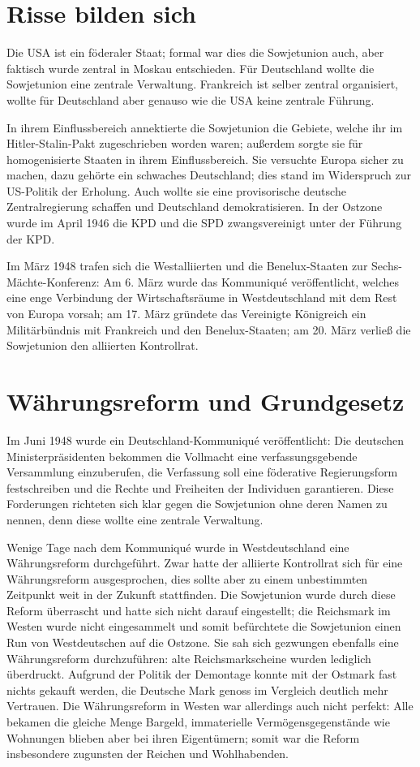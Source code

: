\documentclass[10pt,a4paper,oneside,ngerman,numbers=noenddot]{scrartcl}
\begin{document}
\section{Risse bilden sich}

Die USA ist ein föderaler Staat; formal war dies die Sowjetunion auch, aber faktisch wurde zentral in Moskau
entschieden. Für Deutschland wollte die Sowjetunion eine zentrale Verwaltung. Frankreich ist selber zentral 
organisiert, wollte für Deutschland aber genauso wie die USA keine zentrale Führung.

In ihrem Einflussbereich annektierte die Sowjetunion die Gebiete, welche ihr im Hitler-Stalin-Pakt zugeschrieben
worden waren; außerdem sorgte sie für homogenisierte Staaten in ihrem Einflussbereich. Sie versuchte Europa
sicher zu machen, dazu gehörte ein schwaches Deutschland; dies stand im Widerspruch zur US-Politik der 
Erholung. Auch wollte sie eine provisorische deutsche Zentralregierung schaffen und Deutschland demokratisieren.
In der Ostzone wurde im April 1946 die KPD und die SPD zwangsvereinigt unter der Führung der KPD.

Im März 1948 trafen sich die Westalliierten und die Benelux-Staaten zur Sechs-Mächte-Konferenz: Am 6. März
wurde das Kommuniqué veröffentlicht, welches eine enge Verbindung der Wirtschaftsräume in Westdeutschland mit
dem Rest von Europa vorsah; am 17. März gründete das Vereinigte Königreich ein Militärbündnis mit Frankreich und 
den Benelux-Staaten; am 20. März verließ die Sowjetunion den alliierten Kontrollrat. 

\section{Währungsreform und Grundgesetz}

Im Juni 1948 wurde ein Deutschland-Kommuniqué veröffentlicht: Die deutschen Ministerpräsidenten bekommen die
Vollmacht eine verfassungsgebende Versammlung einzuberufen, die Verfassung soll eine föderative Regierungsform
festschreiben und die Rechte und Freiheiten der Individuen garantieren. Diese Forderungen richteten
sich klar gegen die Sowjetunion ohne deren Namen zu nennen, denn diese wollte eine zentrale Verwaltung.

Wenige Tage nach dem Kommuniqué wurde in Westdeutschland eine Währungsreform durchgeführt. Zwar hatte der
alliierte Kontrollrat sich für eine Währungsreform ausgesprochen, dies sollte aber zu einem unbestimmten Zeitpunkt
weit in der Zukunft stattfinden. Die Sowjetunion wurde durch diese Reform überrascht und hatte sich nicht
darauf eingestellt; die Reichsmark im Westen wurde nicht eingesammelt und somit befürchtete die Sowjetunion einen
Run von Westdeutschen auf die Ostzone. Sie sah sich gezwungen ebenfalls eine Währungsreform durchzuführen:
alte Reichsmarkscheine wurden lediglich überdruckt. Aufgrund der Politik der Demontage konnte mit der Ostmark fast 
nichts gekauft werden, die Deutsche Mark genoss im Vergleich deutlich mehr Vertrauen.
Die Währungsreform in Westen war allerdings auch nicht perfekt: Alle bekamen die gleiche Menge Bargeld, 
immaterielle Vermögensgegenstände wie Wohnungen blieben aber bei ihren Eigentümern; somit war die Reform
insbesondere zugunsten der Reichen und Wohlhabenden.
\end{document}
